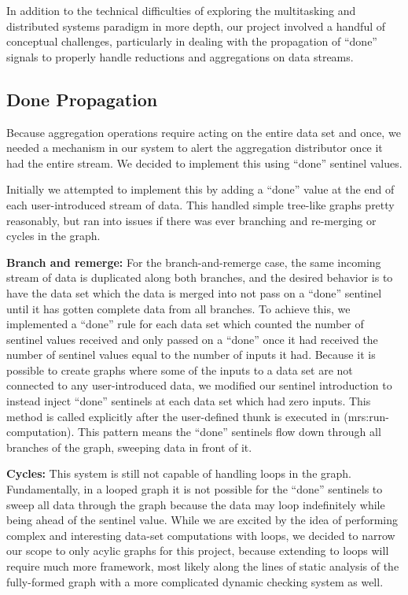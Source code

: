 \documentclass{article}
\begin{document}
In addition to the technical difficulties of exploring the
multitasking and distributed systems paradigm in more depth, our
project involved a handful of conceptual challenges, particularly
in dealing with the propagation of ``done'' signals to properly handle
reductions and aggregations on data streams.

\subsection{Done Propagation}

Because aggregation operations require acting on the entire data set
and once, we needed a mechanism in our system to alert the aggregation
distributor once it had the entire stream. We decided to implement this
using ``done'' sentinel values.

Initially we attempted to implement this by adding a ``done'' value at the
end of each user-introduced stream of data. This handled simple tree-like
graphs pretty reasonably, but ran into issues if there was ever branching and
re-merging or cycles in the graph.

\textbf{Branch and remerge:} For the branch-and-remerge case, the same
incoming stream of data is duplicated along both branches, and the desired
behavior is to have the data set which the data is merged into not pass on
a ``done'' sentinel until it has gotten complete data from all branches.
To achieve this, we implemented a ``done'' rule for each data set which
counted the number of sentinel values received and only passed on a ``done''
once it had received the number of sentinel values equal to the number of
inputs it had. Because it is possible to create graphs where some of the
inputs to a data set are not connected to any user-introduced data, we
modified our sentinel introduction to instead inject ``done'' sentinels
at each data set which had zero inputs. This method is called explicitly
after the user-defined thunk is executed in (mrs:run-computation). This
pattern means the ``done'' sentinels flow down through all branches of
the graph, sweeping data in front of it.

\textbf{Cycles:} This system is still not capable of handling loops in the graph.
Fundamentally,
in a looped graph it is not possible for the ``done'' sentinels to sweep
all data through the graph because the data may loop indefinitely while being
ahead of the sentinel value. While we are excited by the idea of performing
complex and interesting data-set computations with loops, we decided to
narrow our scope to only acylic graphs for this project, because extending
to loops will require much more framework, most likely along the lines of
static analysis of the fully-formed graph with a more complicated dynamic
checking system as well.
\end{document}
